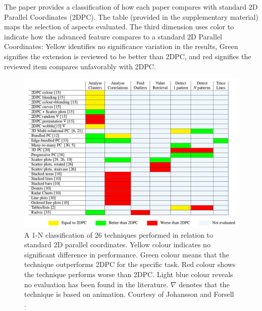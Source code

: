 The paper provides a classification of how each paper compares with standard 2D Parallel Coordinates (2DPC). The table (provided in the supplementary material) maps the selection of aspects evaluated. The third dimension uses color to indicate how the advanced feature compares to a standard 2D Parallel Coordinates: Yellow identifies no significance variation in the results, Green signifies the extension is reviewed to be better than 2DPC, and red signifies the reviewed item compares unfavorably with 2DPC.


\begin{figure}[ht]
\begin{center}
\includegraphics[width=1\textwidth]{images/johansson2016evaluation}
\caption{A 1-N classification of 26 techniques performed in relation to standard 2D parallel coordinates. Yellow colour indicates no significant difference in performance. Green colour means that the technique outperforms 2DPC for the specific task. Red colour shows the technique performs worse than 2DPC. Light blue colour reveals no evaluation has been found in the literature. $\nabla$ denotes that the technique is based on animation. Courtesy of Johansson and Forsell \cite{johansson2016evaluation} .} \label{fig: johansson2016evaluation}
\end{center}
\end{figure}

